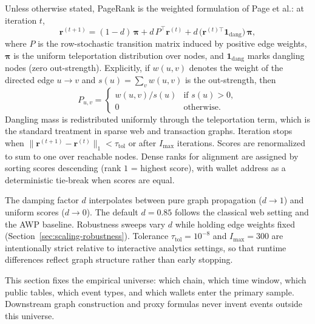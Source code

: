 Unless otherwise stated, PageRank is the weighted formulation of Page et al.: at iteration $t$,
\begin{equation}
\label{eq:pagerank}
\mathbf{r}^{(t+1)}
=
(1-d)\,\boldsymbol{\pi}
+
d\,P^{\top}\mathbf{r}^{(t)}
+
d\,\bigl(\mathbf{r}^{(t)\top}\mathbf{1}_{\mathrm{dang}}\bigr)\,\boldsymbol{\pi},
\end{equation}
where $P$ is the row-stochastic transition matrix induced by positive edge weights, $\boldsymbol{\pi}$ is the uniform teleportation distribution over nodes, and $\mathbf{1}_{\mathrm{dang}}$ marks dangling nodes (zero out-strength). Explicitly, if $w(u,v)$ denotes the weight of the directed edge $u\to v$ and $s(u)=\sum_v w(u,v)$ is the out-strength, then
\begin{equation}
\label{eq:transition-impl}
P_{u,v}
=
\begin{cases}
w(u,v)/s(u) & \text{if }s(u)>0,\\
0 & \text{otherwise.}
\end{cases}
\end{equation}
Dangling mass is redistributed uniformly through the teleportation term, which is the standard treatment in sparse web and transaction graphs. Iteration stops when $\|\mathbf{r}^{(t+1)}-\mathbf{r}^{(t)}\|_1 < \tau_{\mathrm{tol}}$ or after $I_{\max}$ iterations. Scores are renormalized to sum to one over reachable nodes. Dense ranks for alignment are assigned by sorting scores descending (rank $1$ = highest score), with wallet address as a deterministic tie-break when scores are equal.

The damping factor $d$ interpolates between pure graph propagation ($d\to 1$) and uniform scores ($d\to 0$). The default $d=0.85$ follows the classical web setting and the AWP baseline. Robustness sweeps vary $d$ while holding edge weights fixed (Section~\ref{sec:scaling-robustness}). Tolerance $\tau_{\mathrm{tol}}=10^{-8}$ and $I_{\max}=300$ are intentionally strict relative to interactive analytics settings, so that runtime differences reflect graph structure rather than early stopping.


This section fixes the empirical universe: which chain, which time window, which public tables, which event types, and which wallets enter the primary sample. Downstream graph construction and proxy formulas never invent events outside this universe.


